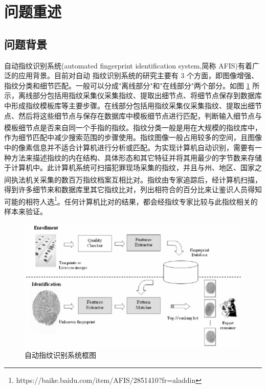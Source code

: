 \documentclass{whutmod}
\newcommand{\upcite}[1]{\textsuperscript{\cite{#1}}}
\begin{document}
	\thispagestyle{empty}
	\tableofcontents
	\setcounter{page}{0}                                               
	\newpage	%
	

	
	\section{问题重述}	
		\subsection{问题背景}
	
自动指纹识别系统(automated fingerprint identification system,简称 AFIS)有着广泛的应用背景。目前对自动 指纹识别系统的研究主要有 3 个方面，即图像增强、指纹分类和细节匹配。一般可以分成"离线部分"和"在线部分"两个部分。如图 \ref{lssct} 所示，离线部分包括用指纹采集仪采集指纹、提取出细节点、将细节点保存到数据库中形成指纹模板库等主要步骤。在线部分包括用指纹采集仪采集指纹、提取出细节点、然后将这些细节点与保存在数据库中模板细节点进行匹配，判断输入细节点与模板细节点是否来自同一个手指的指纹\upcite{1,3}。指纹分类一般是用在大规模的指纹库中，作为细节匹配中减少搜索范围的步骤使用。指纹图像一般占用较多的空间，且图像中的像素信息并不适合计算机进行分析或匹配。为实现计算机自动识别，需要有一种方法来描述指纹的内在结构、具体形态和其它特征并将其用最少的字节数来存储于计算机中。此计算机系统可扫描犯罪现场采集的指纹，并且与州、地区、国家之间执法机关采集的数百万指纹档案互相比对\upcite{2}。指纹由专家追踪后，经计算机扫描，得到许多细节来和数据库里其它指纹比对，列出相符合的百分比来让鉴识人员得知可能的相符人选\footnote{\quad https://baike.baidu.com/item/AFIS/2851410?fr=aladdin}。任何计算机比对的结果，都会经指纹专家比较与此指纹相关的样本来验证。
				\begin{figure}[H]
	\centering
	\includegraphics[width=.8\textwidth]{figures/AFIS.png}
	\caption{自动指纹识别系统框图 }\label{lssct}
\end{figure}
\end{document}
